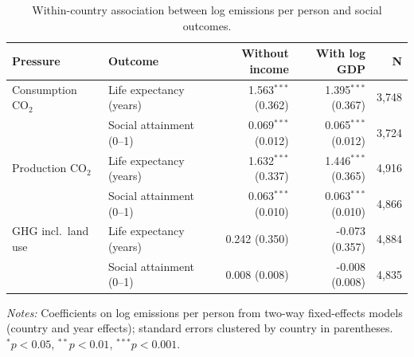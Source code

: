 \begin{table}[tbp]
\centering
\small
\caption{Within-country association between log emissions per person and social outcomes.}
\label{tab:fe}
\begin{threeparttable}
\begin{tabular}{llrrr}
\toprule
Pressure & Outcome & Without income & With log GDP & N \\
\midrule
Consumption CO$_2$ & Life expectancy (years) & 1.563$^{***}$ (0.362) & 1.395$^{***}$ (0.367) & 3,748 \\
 & Social attainment (0--1) & 0.069$^{***}$ (0.012) & 0.065$^{***}$ (0.012) & 3,724 \\
Production CO$_2$ & Life expectancy (years) & 1.632$^{***}$ (0.337) & 1.446$^{***}$ (0.365) & 4,916 \\
 & Social attainment (0--1) & 0.063$^{***}$ (0.010) & 0.063$^{***}$ (0.010) & 4,866 \\
GHG incl.\ land use & Life expectancy (years) & 0.242 (0.350) & -0.073 (0.357) & 4,884 \\
 & Social attainment (0--1) & 0.008 (0.008) & -0.008 (0.008) & 4,835 \\
\bottomrule
\end{tabular}
\begin{tablenotes}[flushleft]
\footnotesize
\item \textit{Notes:} Coefficients on log emissions per person from two-way fixed-effects models (country and year effects); standard errors clustered by country in parentheses. $^{*}p<0.05$, $^{**}p<0.01$, $^{***}p<0.001$.
\end{tablenotes}
\end{threeparttable}
\end{table}
